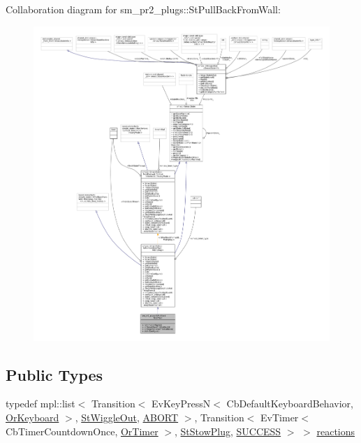 Collaboration diagram for sm\+\_\+pr2\+\_\+plugs\+:\+:St\+Pull\+Back\+From\+Wall\+:
\nopagebreak
\begin{figure}[H]
\begin{center}
\leavevmode
\includegraphics[width=350pt]{structsm__pr2__plugs_1_1StPullBackFromWall__coll__graph}
\end{center}
\end{figure}
\subsection*{Public Types}
\begin{DoxyCompactItemize}
\item 
typedef mpl\+::list$<$ Transition$<$ Ev\+Key\+PressN$<$ Cb\+Default\+Keyboard\+Behavior, \hyperlink{classsm__pr2__plugs_1_1OrKeyboard}{Or\+Keyboard} $>$, \hyperlink{structsm__pr2__plugs_1_1StWiggleOut}{St\+Wiggle\+Out}, \hyperlink{classABORT}{A\+B\+O\+RT} $>$, Transition$<$ Ev\+Timer$<$ Cb\+Timer\+Countdown\+Once, \hyperlink{classsm__pr2__plugs_1_1OrTimer}{Or\+Timer} $>$, \hyperlink{structsm__pr2__plugs_1_1StStowPlug}{St\+Stow\+Plug}, \hyperlink{classSUCCESS}{S\+U\+C\+C\+E\+SS} $>$ $>$ \hyperlink{structsm__pr2__plugs_1_1StPullBackFromWall_ae98bee2aa33bf23dc67a168be155e495}{reactions}
\end{DoxyCompactItemize}
